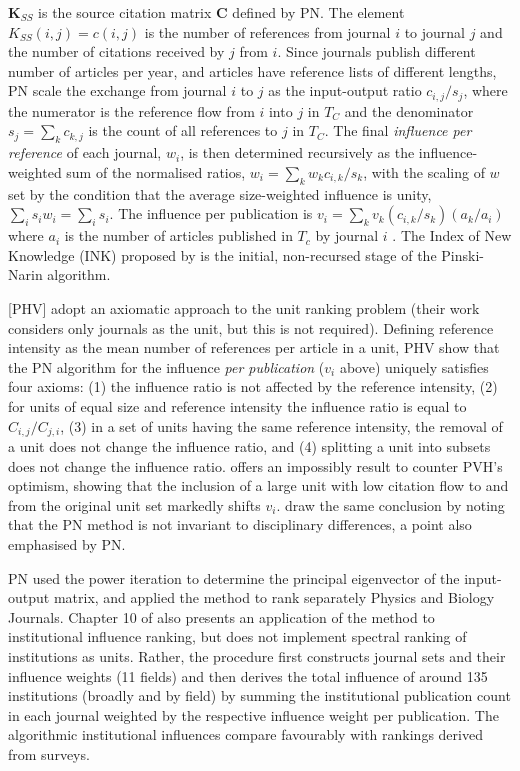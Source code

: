\documentclass[10pt]{article}
\begin{document}
$\mathbf{K}_{SS}$ is the source citation matrix $\mathbf{C}$ defined by PN. The element $K_{SS} (i,j) = c(i,j)$ is the number of references from journal $i$ to journal $j$ and the number of citations received by $j$ from $i$. Since journals publish different number of articles per year, and articles have reference lists of different lengths, PN scale the exchange from journal $i$ to $j$ as the input-output ratio $c_{i,j}/s_j$, where the numerator is the reference flow from $i$ into $j$ in $T_C$ and the denominator $s_j = \sum_k c_{k,j}$ is the count of all references to $j$ in $T_C$. The final \textit{influence per reference} of each journal, $w_i$, is then determined recursively as the influence-weighted sum of the normalised ratios, $w_i = \sum_k w_k c_{i, k}/s_k$, with the scaling of $w$ set by the condition that the average size-weighted influence is unity, $\sum_i s_i w_i = \sum_i s_i$. The influence per publication is $v_i = \sum_kv_k (c_{i,k}/s_k) (a_k/a_i)$ where $a_i$ is the number of articles published in $T_c$ by journal $i$ \citep[see also][]{palacios-huertaMeasurementIntellectualInfluence2004}.  The Index of New Knowledge (INK) proposed by \cite{paulyReinterpretation145influenceWeight1462008} is the initial, non-recursed stage of the Pinski-Narin algorithm.

\cite{palacios-huertaMeasurementIntellectualInfluence2004} [PHV] adopt an axiomatic approach to the unit ranking problem (their work considers only journals as the unit, but this is not required). Defining reference intensity as the mean number of references per article in a unit, PHV show that the PN algorithm for the influence \textit{per publication} ($v_i$ above) uniquely satisfies four axioms: (1) the influence ratio is not affected by the reference intensity, (2) for units of equal size and reference intensity the influence ratio is equal to $C_{i,j}/C_{j,i}$, (3) in a set of units having the same reference intensity, the removal of a unit does not change the influence ratio, and (4) splitting a unit into subsets does not change the influence ratio. \cite{serranoMeasurementIntellectualInfluence2004} offers an impossibly result to counter PVH's optimism, showing that the inclusion of a large unit with low citation flow to and from the original unit set markedly shifts $v_i$. \cite{waltmanRelationEigenfactorAudience2010} draw the same conclusion by noting that the PN method is not invariant to disciplinary differences, a point also emphasised by PN.

PN used the power iteration to determine the principal eigenvector of the input-output matrix, and applied the method to rank separately Physics and Biology Journals. Chapter 10 of \cite{narinEVALUATIVEBIBLIOMETRICSUSE1976} also presents an application of the method to institutional influence ranking, but does not implement spectral ranking of institutions as units. Rather, the procedure first constructs journal sets and their influence weights (11 fields) and then derives the total influence of around 135 institutions (broadly and by field) by summing the institutional publication count in each journal weighted by the respective influence weight per publication. The algorithmic institutional influences compare favourably with rankings derived from surveys.
\end{document}
